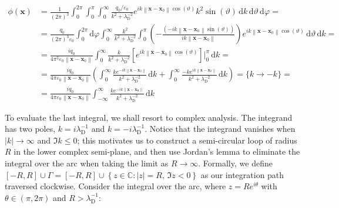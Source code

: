 \begin{align*}
    \phi(\mathbf{x})&=\frac{1}{(2\pi)^3}\int_{0}^{2\pi}\int_{0}^{\pi}\int_{0}^{\infty}\frac{q_0/\varepsilon_0}{k^2+\lambda_\mathrm{D}^{-2}}e^{ik \left\|\mathbf{x}-\mathbf{x}_0\right\|\cos{\left(\vartheta\right)}}k^2\sin(\vartheta)\,\mathrm{d}k\,\mathrm{d}\vartheta\,\mathrm{d}\varphi=\\
    &=\frac{q_0}{(2\pi)^3\varepsilon_0}\int_{0}^{2\pi}\mathrm{d}\varphi\int_0^{\infty}\frac{k^2}{k^2+\lambda_\mathrm{D}^{-2}}\int_{0}^{\pi}\left(-\frac{\left(-ik \left\|\mathbf{x}-\mathbf{x}_0\right\|\sin(\vartheta)\right)}{ik \left\|\mathbf{x}-\mathbf{x}_0\right\|}\right)e^{ik \left\|\mathbf{x}-\mathbf{x}_0\right\|\cos{\left(\vartheta\right)}}\,\mathrm{d}\vartheta\,\mathrm{d}k=\\
    &=\frac{iq_0}{4\pi^2 \varepsilon_0 \left\|\mathbf{x}-\mathbf{x}_0\right\|}\int_0^\infty \frac{k}{k^2+\lambda_{\mathrm{D}}^{-2}}\left[e^{ik \left\|\mathbf{x}-\mathbf{x}_0\right\|\cos{\left(\vartheta\right)}}\right]\biggr|_{0}^{\pi}\,\mathrm{d}k=\\
    &=\frac{i q_0}{4\pi \varepsilon_0 \left\|\mathbf{x}-\mathbf{x}_0\right\|}\left(\int_0^\infty \frac{ke^{-ik \left\|\mathbf{x}-\mathbf{x}_0\right\|}}{k^2+\lambda_{\mathrm{D}}^{-2}}\,\mathrm{d}k+\int_0^\infty\frac{-ke^{ik \left\|\mathbf{x}-\mathbf{x}_0\right\|}}{k^2+\lambda_{\mathrm{D}}^{-2}}\,\mathrm{d}k\right)=\big\{k\to-k\big\}=\\
    &=\frac{iq_0}{4\pi \varepsilon_0 \left\|\mathbf{x}-\mathbf{x}_0\right\|}\int_{-\infty}^\infty \frac{ke^{-ik\|\mathbf{x}-\mathbf{x_0}\|}}{k^2+\lambda_{\mathrm{D}}^{-2}}\,\mathrm{d}k
\end{align*}

To evaluate the last integral, we shall resort to complex analysis. The integrand has two poles, $k=i\lambda_\mathrm{D}^{-1}$ and $k=-i\lambda_\mathrm{D}^{-1}$. Notice that the integrand vanishes when $|k|\to\infty$ and $\Im{k}\leq 0$; this motivates us to construct a semi-circular loop of radius $R$ in the lower complex semi-plane, and then use Jordan's lemma to eliminate the integral over the arc when taking the limit as $R\to\infty$. Formally, we define $[-R,R]\cup\Gamma=[-R,R]\cup\left\{z\in \mathbb{C}:|z|=R,\, \Im{z}<0\right\}$ as our integration path traversed clockwise. Consider the integral over the arc, where $z=Re^{i\theta}$ with $\theta\in(\pi,2\pi)$ and $R>\lambda_{\mathrm{D}}^{-1}$:

